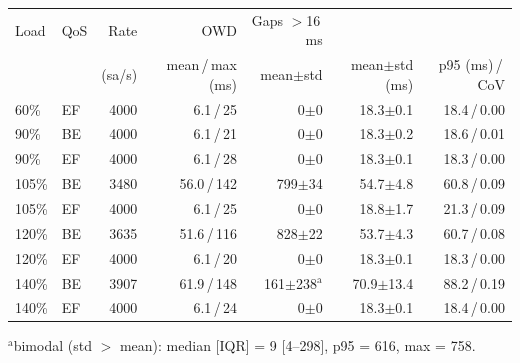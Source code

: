 \begin{tabular}{llrrrrr}
\toprule
Load & QoS & Rate & OWD & Gaps $>$16\,ms & \ttrip{} & \ttrip{} \\
 & & (sa/s) & mean\,/\,max (ms) & mean$\pm$std & mean$\pm$std (ms) & p95 (ms)\,/\,CoV \\
\midrule
60\% & EF & 4000 & 6.1\,/\,25 & 0$\pm$0 & 18.3$\pm$0.1 & 18.4\,/\,0.00 \\
90\% & BE & 4000 & 6.1\,/\,21 & 0$\pm$0 & 18.3$\pm$0.2 & 18.6\,/\,0.01 \\
90\% & EF & 4000 & 6.1\,/\,28 & 0$\pm$0 & 18.3$\pm$0.1 & 18.3\,/\,0.00 \\
105\% & BE & 3480 & 56.0\,/\,142 & 799$\pm$34 & 54.7$\pm$4.8 & 60.8\,/\,0.09 \\
105\% & EF & 4000 & 6.1\,/\,25 & 0$\pm$0 & 18.8$\pm$1.7 & 21.3\,/\,0.09 \\
120\% & BE & 3635 & 51.6\,/\,116 & 828$\pm$22 & 53.7$\pm$4.3 & 60.7\,/\,0.08 \\
120\% & EF & 4000 & 6.1\,/\,20 & 0$\pm$0 & 18.3$\pm$0.1 & 18.3\,/\,0.00 \\
140\% & BE & 3907 & 61.9\,/\,148 & 161$\pm$238$^{\mathrm{a}}$ & 70.9$\pm$13.4 & 88.2\,/\,0.19 \\
140\% & EF & 4000 & 6.1\,/\,24 & 0$\pm$0 & 18.3$\pm$0.1 & 18.4\,/\,0.00 \\
\bottomrule
\end{tabular}
\par\smallskip\footnotesize $^{\mathrm{a}}$bimodal (std $>$ mean): median [IQR] = 9 [4--298], p95 = 616, max = 758.
